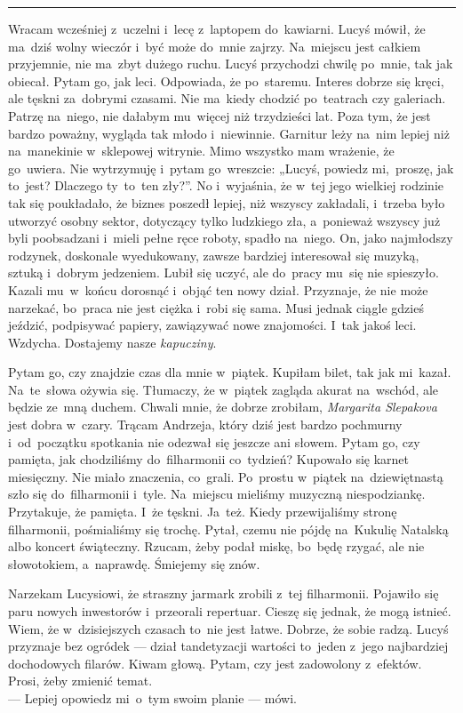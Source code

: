 \documentclass[9pt, a5paper]{memoir}
\begin{document}
\fancybreak{* \quad * \quad *}

Wracam wcześniej z~uczelni i~lecę z~laptopem do~kawiarni. Lucyś mówił, że ma~dziś wolny wieczór i~być może do~mnie zajrzy. Na~miejscu jest całkiem przyjemnie, nie ma~zbyt dużego ruchu. Lucyś przychodzi chwilę po~mnie, tak jak obiecał. Pytam go, jak leci. Odpowiada, że po~staremu. Interes dobrze się kręci, ale tęskni za~dobrymi czasami. Nie ma~kiedy chodzić po~teatrach czy galeriach. Patrzę na~niego, nie dałabym mu~więcej niż trzydzieści lat. Poza tym, że jest bardzo poważny, wygląda tak młodo i~niewinnie. Garnitur leży na~nim lepiej niż na~manekinie w~sklepowej witrynie. Mimo wszystko mam wrażenie, że go~uwiera. Nie wytrzymuję i~pytam go~wreszcie: „Lucyś, powiedz mi,~proszę, jak to~jest? Dlaczego ty~to~ten zły?”. No i~wyjaśnia, że w~tej jego wielkiej rodzinie tak się poukładało, że biznes poszedł lepiej, niż wszyscy zakładali, i~trzeba było utworzyć osobny sektor, dotyczący tylko ludzkiego zła, a~ponieważ wszyscy już byli poobsadzani i~mieli pełne ręce roboty, spadło na~niego. On, jako najmłodszy rodzynek, doskonale wyedukowany, zawsze bardziej interesował się muzyką, sztuką i~dobrym jedzeniem. Lubił się uczyć, ale do~pracy mu~się nie spieszyło. Kazali mu~w~końcu dorosnąć i~objąć ten nowy dział. Przyznaje, że nie może narzekać, bo~praca nie jest ciężka i~robi się sama. Musi jednak ciągle gdzieś jeździć, podpisywać papiery, zawiązywać nowe znajomości. I~tak jakoś leci. Wzdycha. Dostajemy nasze \textit{kapucziny}.

Pytam go, czy znajdzie czas dla mnie w~piątek. Kupiłam bilet, tak jak mi~kazał. Na~te~słowa ożywia się. Tłumaczy, że w~piątek zagląda akurat na~wschód, ale będzie ze~mną duchem. Chwali mnie, że dobrze zrobiłam, \textit{Margarita Slepakova} jest dobra w~czary. Trącam Andrzeja, który dziś jest bardzo pochmurny i~od~początku spotkania nie odezwał się jeszcze ani słowem. Pytam go, czy pamięta, jak chodziliśmy do~filharmonii co~tydzień? Kupowało się karnet miesięczny. Nie miało znaczenia, co~grali. Po~prostu w~piątek na~dziewiętnastą szło się do~filharmonii i~tyle. Na~miejscu mieliśmy muzyczną niespodziankę. Przytakuje, że pamięta. I~że tęskni. Ja~też. Kiedy przewijaliśmy stronę filharmonii, pośmialiśmy się trochę. Pytał, czemu nie pójdę na~Kukulię Natalską albo koncert świąteczny. Rzucam, żeby podał miskę, bo~będę rzygać, ale nie słowotokiem, a~naprawdę. Śmiejemy się znów.

Narzekam Lucysiowi, że straszny jarmark zrobili z~tej filharmonii. Pojawiło się paru nowych inwestorów i~przeorali repertuar. Cieszę się jednak, że mogą istnieć. Wiem, że w~dzisiejszych czasach to~nie jest łatwe. Dobrze, że sobie radzą. Lucyś przyznaje bez ogródek --- dział tandetyzacji wartości to~jeden z~jego najbardziej dochodowych filarów. Kiwam głową. Pytam, czy jest zadowolony z~efektów. Prosi, żeby zmienić temat.\\
--- Lepiej opowiedz mi~o~tym swoim planie --- mówi.
\end{document}
